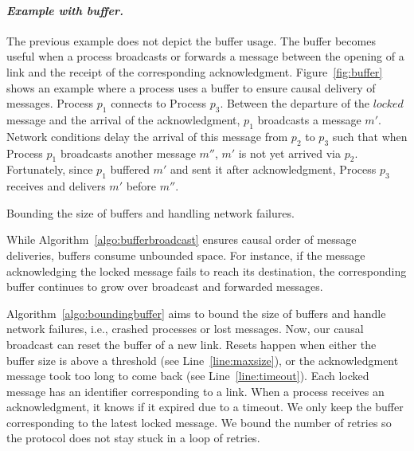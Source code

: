 \paragraph{\emph{Example with buffer.}} The previous example does not depict the
buffer usage. The buffer becomes useful when a process broadcasts or forwards a
message between the opening of a link and the receipt of the corresponding
acknowledgment. Figure~\ref{fig:buffer} shows an example where a process uses a
buffer to ensure causal delivery of messages. Process $p_1$ connects to Process
$p_3$. Between the departure of the $locked$ message and the arrival of the
acknowledgment, $p_1$ broadcasts a message $m'$. Network conditions
delay the arrival of this message from $p_2$ to $p_3$ such that when Process
$p_1$ broadcasts another message $m''$, $m'$ is not yet arrived via
$p_2$. Fortunately, since $p_1$ buffered $m'$ and sent it after acknowledgment,
Process $p_3$ receives and delivers $m'$ before $m''$.


\begin{algorithm}
  
  \caption{\label{algo:boundingbuffer}Bounding the size of buffers and handling
    network failures.}
\end{algorithm}

While Algorithm~\ref{algo:bufferbroadcast} ensures causal order of message
deliveries, buffers consume unbounded space. For instance, if the message
acknowledging the locked message fails to reach its destination, the
corresponding buffer continues to grow over broadcast and forwarded messages. 

Algorithm~\ref{algo:boundingbuffer} aims to bound the size of buffers and handle
network failures, i.e., crashed processes or lost messages. Now, our causal
broadcast can reset the buffer of a new link. Resets happen when either the
buffer size is above a threshold (see Line~\ref{line:maxsize}), or the
acknowledgment message took too long to come back (see
Line~\ref{line:timeout}). Each locked message has an identifier corresponding to
a link. When a process receives an acknowledgment, it knows if it expired due to
a timeout. We only keep the buffer corresponding to the latest locked
message. We bound the number of retries so the protocol does not stay stuck in a
loop of retries.


%   


